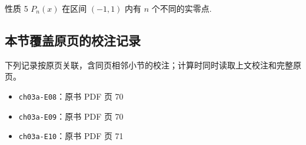 \documentclass[
  10pt,
  fontset=fandol]{ctexart}
\providecommand{\tightlist}{%
  \setlength{\itemsep}{0pt}\setlength{\parskip}{0pt}}
\begin{document}
性质 5 \(P_n(x)\) 在区间 \((-1, 1)\) 内有 \(n\) 个不同的实零点.

\subsection{本节覆盖原页的校注记录}\label{ux672cux8282ux8986ux76d6ux539fux9875ux7684ux6821ux6ce8ux8bb0ux5f55}

下列记录按原页关联，含同页相邻小节的校注；计算时同时读取上文校注和完整原页。

\begin{itemize}
\tightlist
\item
  \texttt{ch03a-E08}：原书 PDF 页 70
\item
  \texttt{ch03a-E09}：原书 PDF 页 70
\item
  \texttt{ch03a-E10}：原书 PDF 页 71
\end{itemize}
\end{document}
